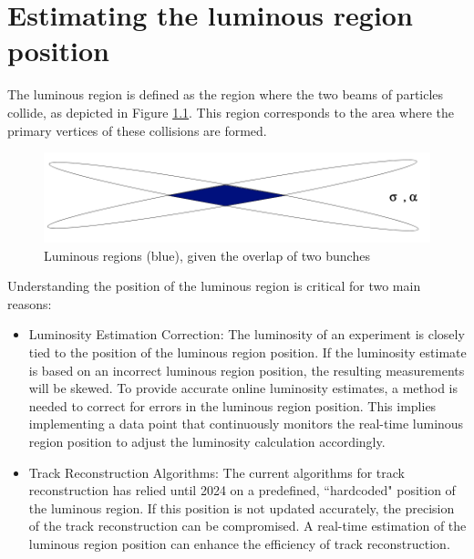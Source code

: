 \chapter{Estimating the luminous region position}\label{chap:beamline}
The luminous region is defined as the region where the two beams of particles collide, as depicted in Figure \ref{fig:luminous-region}. This region corresponds to the area where the primary vertices of these collisions are formed.



\begin{figure}
    \centering
    \includegraphics[width=\textwidth]{figures/luminous_region.png}
    \caption{Luminous regions (blue), given the overlap of two bunches}
    \label{fig:luminous-region}
\end{figure}



Understanding the position of the luminous region is critical for two main reasons:
\begin{itemize}
\item Luminosity Estimation Correction: The luminosity of an experiment is closely tied to the position of the luminous region position. If the luminosity estimate is based on an incorrect luminous region position, the resulting measurements will be skewed. To provide accurate online luminosity estimates, a method is needed to correct for errors in the luminous region position. This implies implementing a data point that continuously monitors the real-time luminous region position to adjust the luminosity calculation accordingly.
\item Track Reconstruction Algorithms: The current algorithms for track reconstruction has relied until 2024 on a predefined, ``hardcoded" position of the luminous region. If this position is not updated accurately, the precision of the track reconstruction can be compromised. A real-time estimation of the luminous region position can enhance the efficiency of track reconstruction.
\end{itemize}

